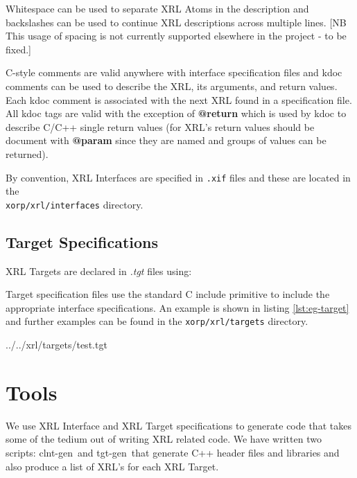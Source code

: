 \documentclass[11pt]{article}
\newcommand{\clntgen}{{\sf clnt-gen}~}
\newcommand{\tgtgen}{{\sf tgt-gen}~}
\begin{document}


Whitespace can be used to separate XRL Atoms in the description and
backslashes can be used to continue XRL descriptions across multiple
lines.  [NB This usage of spacing is not currently supported
elsewhere in the project - to be fixed.]

C-style comments are valid anywhere with interface specification files
and kdoc comments can be used to describe the XRL, its arguments, and
return values.  Each kdoc comment is associated with the next XRL
found in a specification file.  All kdoc tags are valid with the
exception of \textbf{@return} which is used by kdoc to describe C/C++
single return values (for XRL's return values should be document with
\textbf{@param} since they are named and groups of values can be
returned).

By convention, XRL Interfaces are specified in \texttt{.xif} files and these
are located in the \\
\texttt{xorp/xrl/interfaces} directory.

\subsection{Target Specifications}

XRL Targets are declared in \textit{.tgt} files using:

\smallskip
\noindent{}

\smallskip Target specification files use the standard C include
primitive to include the appropriate interface specifications.  An
example is shown in listing \ref{lst:eg-target} and further examples
can be found in the \texttt{xorp/xrl/targets} directory.

%
{../../xrl/targets/test.tgt}

\section{Tools}

We use XRL Interface and XRL Target specifications to generate code
that takes some of the tedium out of writing XRL related code.  We
have written two scripts: \clntgen and \tgtgen that
generate C++ header files and libraries and also produce a list of
XRL's for each XRL Target.
\end{document}
